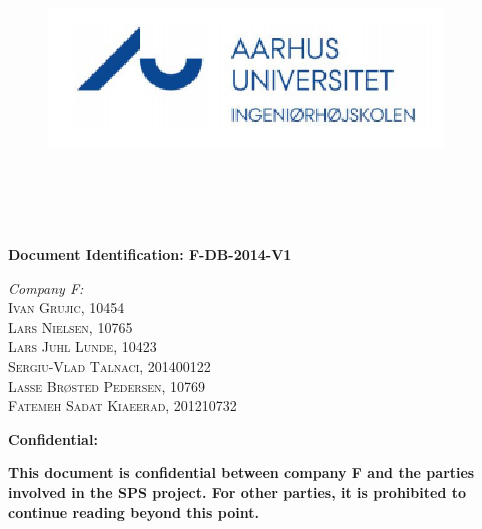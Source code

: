 \begin{titlepage}
\begin{center}



\begin{figure}
\includegraphics[scale=0.5]{./images/logo.png}\\
\\   
\\
\end{figure}
\\[0.5cm]
\\[2cm]

{ \bfseries Document Identification: F-DB-2014-V1}\\[2cm]



\begin{flushleft} \large
\emph{Company F:}\\
\textsc{Ivan Grujic, 10454\\}
\textsc{Lars Nielsen, 10765\\}
\textsc{Lars Juhl Lunde, 10423\\}
\textsc{Sergiu-Vlad Talnaci, 201400122\\}
\textsc{Lasse Br\o sted Pedersen, 10769\\}
\textsc{Fatemeh Sadat Kiaeerad, 201210732}\\[2cm]
\begin{framed}
\begin{center}
\Huge{ \textbf{{\color{red} Confidential:}}}\\
\end{center}
\Large{\textbf{{This document is confidential between company F and the parties involved in the SPS project. For other parties, it is prohibited to continue reading beyond this point.}}}
\end{framed}
\end{flushleft}




\end{center}
\end{titlepage}
